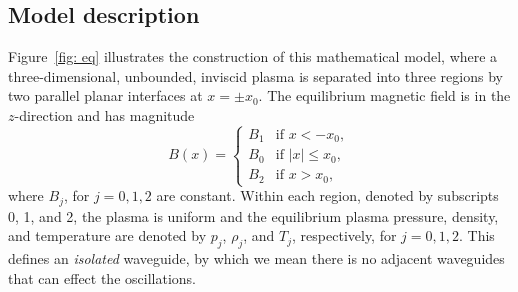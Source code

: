 \documentclass[12pt,draft]{../style-files/ociamthesis}
\begin{document}
\subsection{Model description}
Figure~\ref{fig: eq} illustrates the construction of this mathematical model, where a three-dimensional, unbounded, inviscid plasma is separated into three regions by two parallel planar interfaces at $x = \pm x_0$. The equilibrium magnetic field is in the $z$-direction and has magnitude
\begin{equation}
	B(x)=
	\begin{cases}
		B_1 & \text{if } x < -x_0, \\
		B_0 & \text{if } |x|\leq{x_0}, \\
		B_2 & \text{if } x > x_0,
	\end{cases}
\end{equation}
where $B_j$, for $j = 0, 1, 2$ are constant. Within each region, denoted by subscripts 0, 1, and 2, the plasma is uniform and the equilibrium plasma pressure, density, and temperature are denoted by $p_j$, $\rho_j$, and $T_j$, respectively, for $j = 0, 1, 2$. This defines an \textit{isolated} waveguide, by which we mean there is no adjacent waveguides that can effect the oscillations.
\end{document}
